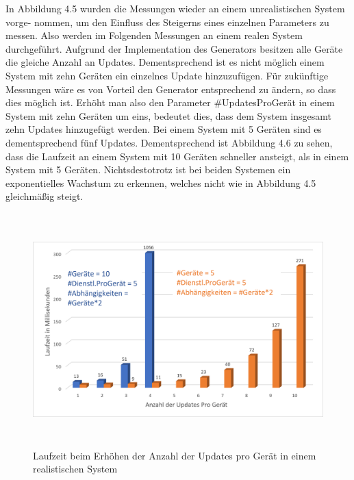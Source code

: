 \newpage
In Abbildung 4.5 wurden die Messungen wieder an einem unrealistischen System vorge-
nommen, um den Einfluss des Steigerns eines einzelnen Parameters zu messen. 
Also werden im Folgenden Messungen an einem realen System durchgeführt. Aufgrund der Implementation des Generators besitzen alle Geräte die gleiche Anzahl
an Updates. Dementsprechend ist es nicht möglich einem System mit zehn Geräten ein einzelnes Update hinzuzufügen. Für zukünftige Messungen wäre es von Vorteil
den Generator entsprechend zu ändern, so dass dies möglich ist. Erhöht man also den Parameter \#UpdatesProGerät in einem System mit zehn Geräten um eins, bedeutet
dies, dass dem System insgesamt zehn Updates hinzugefügt werden. Bei einem System mit 5 Geräten sind es dementsprechend fünf Updates.
Dementsprechend ist Abbildung 4.6 zu sehen, dass die Laufzeit an einem System mit 10 Geräten schneller ansteigt, als in
einem System mit 5 Geräten. Nichtsdestotrotz ist bei beiden Systemen ein exponentielles Wachstum zu erkennen, welches nicht wie in Abbildung 4.5 gleichmäßig steigt.

\begin{figure}[h]
\begin{center}
\includegraphics[width=14cm,height=9cm]{"images/Steigende Updatezahl real"}
\caption{Laufzeit beim Erhöhen der Anzahl der Updates pro Gerät in einem realistischen System}
\label{fig:Prob1:MEA}
\end{center}
\end{figure}

\newpage

